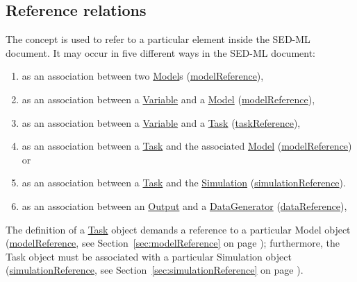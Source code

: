\subsection{Reference relations}
\label{sec:reference}

The  concept is used to refer to a particular element inside the SED-ML document. It may occur in five different ways in the SED-ML document:
%
\begin{enumerate}
\item{as an association between two \hyperref[class:model]{Model}s (\hyperref[sec:modelReference]{modelReference}),}
\item{as an association between a \hyperref[class:variable]{Variable} and a \hyperref[class:model]{Model} (\hyperref[sec:modelReference]{modelReference}),}
\item{as an association between a \hyperref[class:variable]{Variable} and a \hyperref[class:task]{Task} (\hyperref[sec:taskReference]{taskReference}),}
\item{as an association between a \hyperref[class:task]{Task} and the associated \hyperref[class:model]{Model} (\hyperref[sec:modelReference]{modelReference}) or}
\item{as an association between a \hyperref[class:task]{Task} and the \hyperref[class:simulation]{Simulation} (\hyperref[sec:simulationReference]{simulationReference}).}
\item{as an association between an \hyperref[class:output]{Output} and a \hyperref[class:dataGenerator]{DataGenerator} (\hyperref[sec:dataReference]{dataReference}),}
\end{enumerate}
%
The definition of a \hyperref[class:task]{Task} object demands a reference to a particular Model object (\hyperref[sec:modelReference]{modelReference}, see Section~\ref{sec:modelReference} on page \pageref{sec:modelReference}); furthermore, the Task object must be associated with a particular Simulation object (\hyperref[sec:simulationReference]{simulationReference}, see Section~\ref{sec:simulationReference} on page \pageref{sec:simulationReference}).

